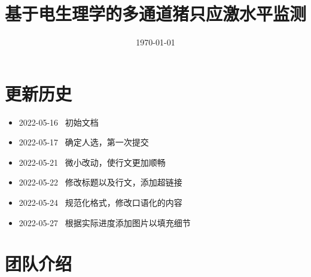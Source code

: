 \documentclass[UTF8]{ctexart}
\begin{document}
\title{基于电生理学的多通道猪只应激水平监测}
\author{}
\date{\today}

\maketitle
\thispagestyle{empty}


\newpage
{} %
\fancyhead{} %
\tableofcontents


\newpage
\rhead{}%
\setcounter{page}{1}   %

\section*{更新历史}

\begin{itemize}
    \item 2022-05-16 ~初始文档
    \item 2022-05-17 ~确定人选，第一次提交
    \item 2022-05-21 ~微小改动，使行文更加顺畅
    \item 2022-05-22 ~修改标题以及行文，添加超链接
    \item 2022-05-24 ~规范化格式，修改口语化的内容
    \item 2022-05-27 ~根据实际进度添加图片以填充细节
\end{itemize}

\newpage
\section{团队介绍}
\end{document}
